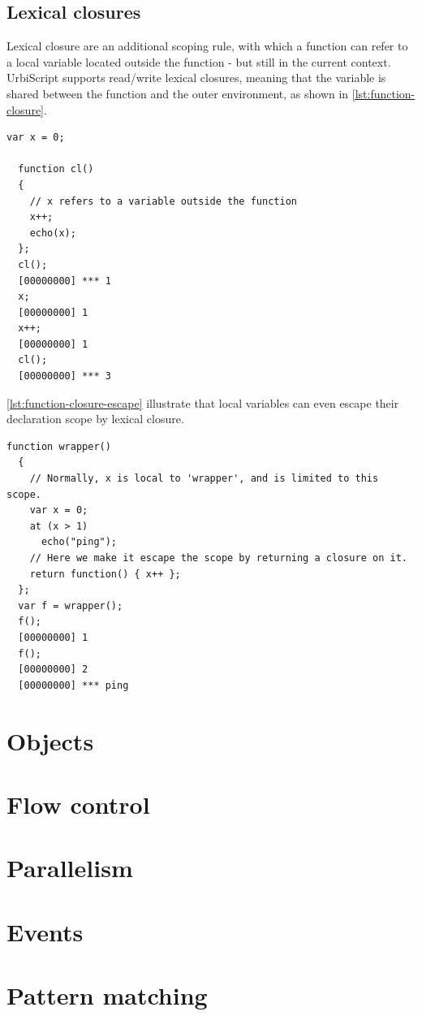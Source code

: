 \documentclass[openright,twoside,12pt]{report}
\newcommand{\us}{UrbiScript\xspace}
\newcommand   {\floatpos}          {htbp}
\newcommand{\lst}[1]{\autoref{lst:#1}}
\begin{document}
\subsection{Lexical closures}
\label{sect:us-fun-closures}

Lexical closure are an additional scoping rule, with which a function
can refer to a local variable located outside the function - but still
in the current context. \us supports read/write lexical closures,
meaning that the variable is shared between the function and the outer
environment, as shown in \lst{function-closure}.

\begin{lstlisting}[caption=Lexical
  closure,label=lst:function-closure,float=\floatpos]
  var x = 0;

  function cl()
  {
    // x refers to a variable outside the function
    x++;
    echo(x);
  };
  cl();
  [00000000] *** 1
  x;
  [00000000] 1
  x++;
  [00000000] 1
  cl();
  [00000000] *** 3
\end{lstlisting}

\lst{function-closure-escape} illustrate that local variables can even
escape their declaration scope by lexical closure.

\begin{lstlisting}[caption=Local variable escaping its scope by
  lexical closure.,label=lst:function-closure-escape,float=\floatpos]
  function wrapper()
  {
    // Normally, x is local to 'wrapper', and is limited to this scope.
    var x = 0;
    at (x > 1)
      echo("ping");
    // Here we make it escape the scope by returning a closure on it.
    return function() { x++ };
  };
  var f = wrapper();
  f();
  [00000000] 1
  f();
  [00000000] 2
  [00000000] *** ping
\end{lstlisting}

\section{Objects}
\section{Flow control}
\section{Parallelism}
\section{Events}
\section{Pattern matching}
\end{document}
